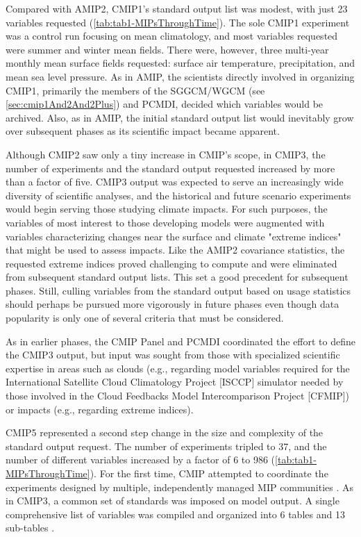 \documentclass[manuscript]{copernicus}
\begin{document}
Compared with AMIP2, CMIP1's standard output list was modest, with just 23 variables requested (\autoref{tab:tab1-MIPsThroughTime}). The sole CMIP1 experiment was a control run focusing on mean climatology, and most variables requested were summer and winter mean fields. There were, however, three multi-year monthly mean surface fields requested: surface air temperature, precipitation, and mean sea level pressure. As in AMIP, the scientists directly involved in organizing CMIP1, primarily the members of the SGGCM/WGCM (see \autoref{sec:cmip1And2And2Plus}) and PCMDI, decided which variables would be archived. Also, as in AMIP, the initial standard output list would inevitably grow over subsequent phases as its scientific impact became apparent.

Although CMIP2 saw only a tiny increase in CMIP's scope, in CMIP3, the number of experiments and the standard output requested increased by more than a factor of five. CMIP3 output was expected to serve an increasingly wide diversity of scientific analyses, and the historical and future scenario experiments would begin serving those studying climate impacts. For such purposes, the variables of most interest to those developing models were augmented with variables characterizing changes near the surface and climate "extreme indices" that might be used to assess impacts. Like the AMIP2 covariance statistics, the requested extreme indices proved challenging to compute and were eliminated from subsequent standard output lists. This set a good precedent for subsequent phases. Still, culling variables from the standard output based on usage statistics should perhaps be pursued more vigorously in future phases even though data popularity is only one of several criteria that must be considered. 

As in earlier phases, the CMIP Panel and PCMDI coordinated the effort to define the CMIP3 output, but input was sought from those with specialized scientific expertise in areas such as clouds (e.g., regarding model variables required for the International Satellite Cloud Climatology Project [ISCCP] simulator needed by those involved in the Cloud Feedbacks Model Intercomparison Project [CFMIP]) or impacts (e.g., regarding extreme indices).

CMIP5 represented a second step change in the size and complexity of the standard output request. The number of experiments tripled to 37, and the number of different variables increased by a factor of 6 to 986 (\autoref{tab:tab1-MIPsThroughTime}). For the first time, CMIP attempted to coordinate the experiments designed by multiple, independently managed MIP communities \citep[and all experiments were briefly described by the CMIP5 overview paper,][also see \autoref{tab:tabAppA1-MIPExperiments}]{taylor_overview_2012}. As in CMIP3, a common set of standards was imposed on model output. A single comprehensive list of variables was compiled and organized into 6 tables and 13 sub-tables \citep[\autoref{tab:tab1-MIPsThroughTime}, \autoref{tab:tabAppB1-MIPStandardOutput};][]{taylor_pcmdi_2013}.
\end{document}
